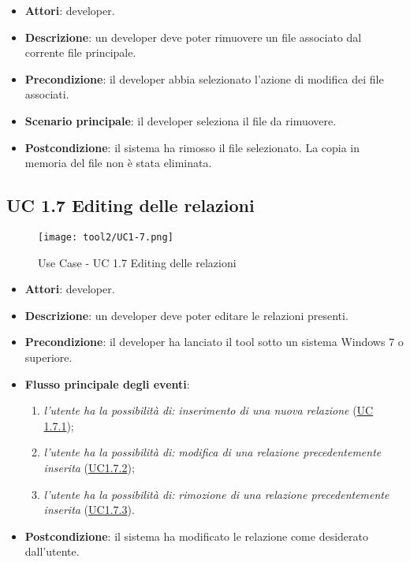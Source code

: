 		\begin{itemize}
			\item\textbf{Attori}: developer.
			\item\textbf{Descrizione}: un developer deve poter rimuovere un file associato dal corrente file principale.
			\item\textbf{Precondizione}: il developer abbia selezionato l'azione di modifica dei file associati.
			\item\textbf{Scenario principale}: il developer seleziona il file da rimuovere.
			\item\textbf{Postcondizione}: il sistema ha rimosso il file selezionato. La copia in memoria del file non è stata eliminata.
		\end{itemize}
		
	\subsection{UC 1.7 Editing delle relazioni}
		\label{subsec:XEUC1.7}
		
		\begin{figure}[!h] 
			\centering 
			\texttt{[image: tool2/UC1-7.png]} 
			\caption{Use Case - UC 1.7 Editing delle relazioni}
		\end{figure}
		
		\begin{itemize}
			\item\textbf{Attori}: developer.
			\item\textbf{Descrizione}: un developer deve poter editare le relazioni presenti.
			\item\textbf{Precondizione}: il developer ha lanciato il tool sotto un sistema Windows 7 o superiore.
			\item\textbf{Flusso principale degli eventi}: 
			\begin{enumerate}
				\item \textit{l'utente ha la possibilità di:} \textit{inserimento di una nuova relazione} (\hyperref[subsec:XEUC1.7.1]{UC 1.7.1});
				
				\item \textit{l'utente ha la possibilità di:} \textit{modifica di una relazione precedentemente inserita} (\hyperref[subsec:XEUC1.7.2]{UC1.7.2});
				
				\item \textit{l'utente ha la possibilità di:} \textit{rimozione di una relazione precedentemente inserita} (\hyperref[subsec:XEUC1.7.3]{UC1.7.3}).
				
			\end{enumerate}
			\item\textbf{Postcondizione}: il sistema ha modificato le relazione come desiderato dall'utente.
		\end{itemize}
		
